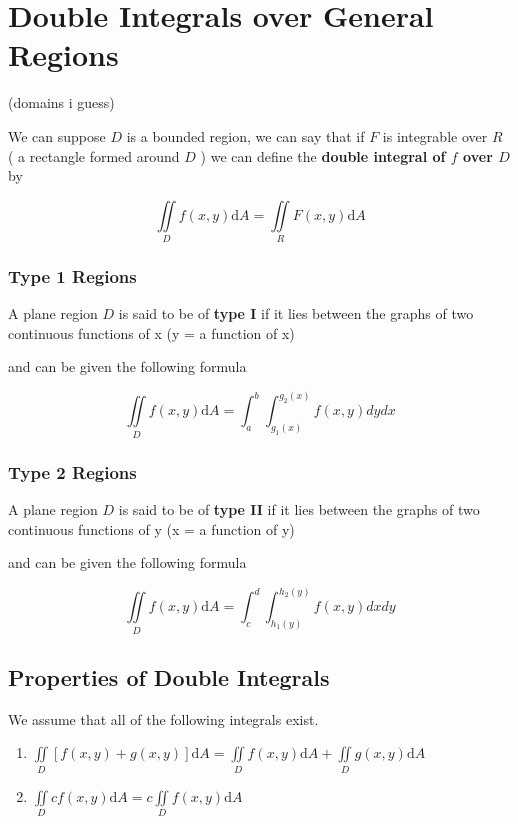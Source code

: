 \documentclass{article}
\begin{document}
\newpage
\section{Double Integrals over General Regions}

(domains i guess)

We can suppose $D$ is a bounded region, we can say that if $F$ is integrable over $R$ ( a rectangle formed around $D$ ) we can define the \textbf{double integral of $f$ over $D$} by 

$$\iint\limits_{D}f(x,y)\mathrm{d}A = \iint\limits_{R}F(x,y)\mathrm{d}A$$

\subsubsection*{Type 1 Regions}

A plane region $D$ is said to be of \textbf{type I} if it lies between the graphs of two continuous functions of x (y = a function of x)

and can be given the following formula

$$\iint\limits_{D}f(x,y)\mathrm{d}A = \int^b_a\int^{g_2(x)}_{g_1(x)} f(x,y) dy dx$$

\subsubsection*{Type 2 Regions}

A plane region $D$ is said to be of \textbf{type II} if it lies between the graphs of two continuous functions of y (x = a function of y)

and can be given the following formula

$$\iint\limits_{D}f(x,y)\mathrm{d}A = \int^d_c\int^{h_2(y)}_{h_1(y)} f(x,y) dx dy$$

\subsection{Properties of Double Integrals}

We assume that all of the following integrals exist.

\begin{enumerate}
    \item $\iint\limits_{D}[f(x,y) + g(x,y)]\mathrm{d}A = \iint\limits_{D}f(x,y)\mathrm{d}A + \iint\limits_{D}g(x,y)\mathrm{d}A$
    \item $\iint\limits_{D}cf(x,y)\mathrm{d}A = c \iint\limits_{D}f(x,y)\mathrm{d}A$
\end{enumerate}
\end{document}
